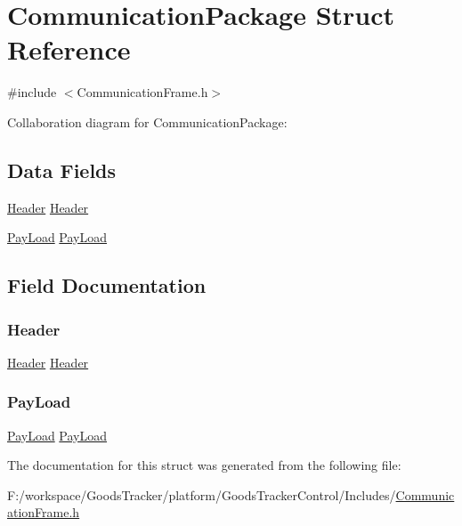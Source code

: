 \hypertarget{struct_communication_package}{}\section{Communication\+Package Struct Reference}
\label{struct_communication_package}


{\ttfamily \#include $<$Communication\+Frame.\+h$>$}



Collaboration diagram for Communication\+Package\+:
\subsection*{Data Fields}
\begin{DoxyCompactItemize}
\item 
\hyperlink{struct_header}{Header} \hyperlink{struct_communication_package_aaab4745fbbb8ab6511c16c6ae5a3138e}{Header}
\item 
\hyperlink{struct_pay_load}{Pay\+Load} \hyperlink{struct_communication_package_a7d8ea7f461798d1ac12fc9d9b8fc28b1}{Pay\+Load}
\end{DoxyCompactItemize}


\subsection{Field Documentation}
\mbox{\label{struct_communication_package_aaab4745fbbb8ab6511c16c6ae5a3138e}} 
\subsubsection{\texorpdfstring{Header}{Header}}
{\footnotesize\ttfamily \hyperlink{struct_header}{Header} \hyperlink{struct_header}{Header}}

\mbox{\label{struct_communication_package_a7d8ea7f461798d1ac12fc9d9b8fc28b1}} 
\subsubsection{\texorpdfstring{Pay\+Load}{PayLoad}}
{\footnotesize\ttfamily \hyperlink{struct_pay_load}{Pay\+Load} \hyperlink{struct_pay_load}{Pay\+Load}}



The documentation for this struct was generated from the following file\+:\begin{DoxyCompactItemize}
\item 
F\+:/workspace/\+Goods\+Tracker/platform/\+Goods\+Tracker\+Control/\+Includes/\hyperlink{_communication_frame_8h}{Communication\+Frame.\+h}\end{DoxyCompactItemize}
